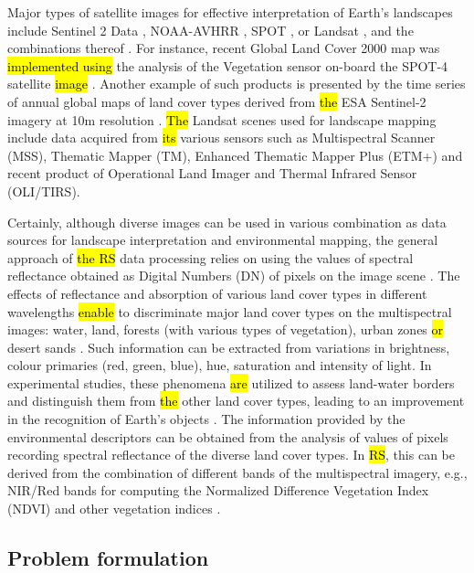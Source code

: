 \documentclass[earth,article,submit,pdftex,moreauthors]{Definitions/mdpi}
\begin{document}
Major types of satellite images for effective interpretation of Earth's landscapes include Sentinel 2 Data \cite{Ngom,TONG2020111598}, NOAA-AVHRR \cite{KONARSKA2002491,ANYAMBA2005596,Frederiksen}, SPOT \cite{SILVA2005188,MARTINEZ2011152}, or Landsat \cite{PIMPLE2020118007,Lemenkova202315}, and the combinations thereof \cite{rs12193157}. For instance, recent Global Land Cover 2000 map was \hl{implemented using }the analysis of the Vegetation sensor on-board the SPOT-4 satellite \hl{image }\cite{Mayaux}. {Another example of such products is presented by the time series of annual global maps of land cover types derived from \hl{the }ESA Sentinel-2 imagery at 10m resolution }\cite{Karraetal}. \hl{The }Landsat scenes used for landscape mapping include\hl{ }data acquired from \hl{its }various\hl{ }sensors such as Multispectral Scanner (MSS), Thematic Mapper (TM), Enhanced Thematic Mapper Plus (ETM+) and recent product of Operational Land Imager and Thermal Infrared Sensor (OLI/TIRS).

Certainly, although diverse images can be used in various combination as data sources for landscape interpretation and environmental mapping, the general approach of \hl{the RS} data processing relies on using {the values of} spectral reflectance obtained as {Digital Numbers (DN)} of pixels on the image scene \cite{ACKER2014}. The effects of reflectance and absorption of various land cover types in different wavelengths{ }\hl{enable }to discriminate major land cover types on the multispectral images: water, land, forests (with various types of vegetation), urban zones \hl{or} desert sands \cite{rs12101634}. {Such information can be extracted from} variations in brightness, colour primaries (red, green, blue), hue, saturation and intensity of light{. In experimental studies, these phenomena \hl{are} utilized to assess land-water borders and distinguish them from \hl{the }other land cover types, leading to an improvement in the recognition of Earth's objects} \cite{rs13132454}. {The} information{ }provided by the environmental descriptors{ }can be obtained from the analysis of values of pixels recording spectral reflectance of {the} diverse land cover types{. In \hl{RS}, this can be} derived from the combination of different bands {of the} multispectral imagery, e.g., NIR/Red bands for computing the Normalized Difference Vegetation Index (NDVI) and other vegetation indices \cite{CRIPPEN199071,LI2004463,jmse11040871,RUAN2022157075}.

\subsection{Problem formulation}
\end{document}
